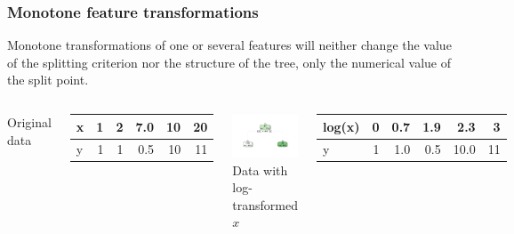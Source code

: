 \begin{frame}
\frametitle{Monotone feature transformations }

Monotone transformations of one or several features will neither change the value of the splitting criterion nor the structure of the tree,  only the numerical value of the split point.
\vspace{0.5cm}
\begin{columns}[T]
Original data
\begin{knitrout}\scriptsize
{}\color{fgcolor}
\begin{tabular}{l|r|r|r|r|r}
\hline
x & 1 & 2 & 7.0 & 10 & 20\\
\hline
y & 1 & 1 & 0.5 & 10 & 11\\
\hline
\end{tabular}


\end{knitrout}
\includegraphics[width = \textwidth]{figure/cart_splitcomp_1}
Data with log-transformed $x$
\begin{knitrout}\scriptsize
{}\color{fgcolor}
\begin{tabular}{l|r|r|r|r|r}
\hline
log(x) & 0 & 0.7 & 1.9 & 2.3 & 3\\
\hline
y & 1 & 1.0 & 0.5 & 10.0 & 11\\
\hline
\end{tabular}



\end{knitrout}
\end{columns}
\end{frame}
